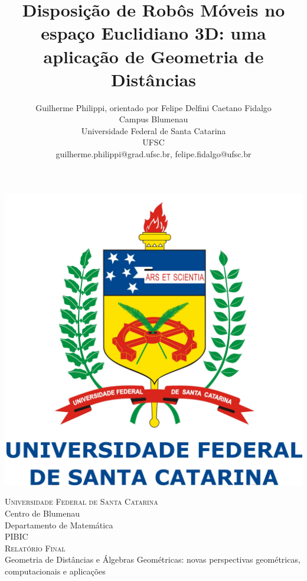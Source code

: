 \documentclass[a4paper,12pt]{article}
\title{Disposição de Robôs Móveis no espaço Euclidiano 3D: uma aplicação de Geometria de Distâncias}
\author{Guilherme Philippi\Mark{*}, orientado por Felipe Delfini Caetano Fidalgo\Mark{\dagger}\\Campus Blumenau\\Universidade Federal de Santa Catarina\\UFSC
	\\guilherme.philippi@grad.ufsc.br\Mark{*}, felipe.fidalgo@ufsc.br\Mark{\dagger}}
\begin{document}
	\begin{titlepage}
		\newcommand{\HRule}{\rule{\linewidth}{0.5mm}} %
		\center %
		\begin{center}
			\includegraphics[scale=0.22]{figures/logoufsc.jpg}
		\end{center}
		\vspace{1cm}
		
		\textsc{\LARGE \hspace{-0.17cm}Universidade Federal de Santa Catarina}\\[0.5cm] %
		{\Large Centro de Blumenau \\ Departamento de Matemática}\\[1.5cm] %
		\textsc{\Large PIBIC \\ Relatório Final \vspace{1.5cm}  \\ }{\large Geometria de Distâncias e Álgebras Geométricas: novas perspectivas geométricas, computacionais e aplicações}\\[2.0cm] %
		

\end{titlepage}
\end{document}
